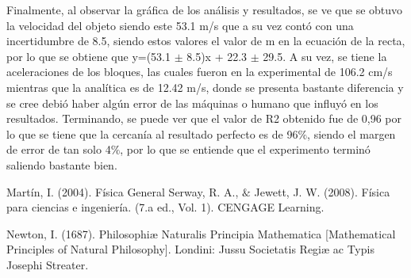 \documentclass{article}
\begin{document}
\begin{multicols}{2}
Finalmente, al observar la gráfica de los análisis y resultados, se ve que se obtuvo la velocidad del objeto siendo este 53.1 m/s que a su vez contó con una incertidumbre de 8.5, siendo estos valores el valor de m en la ecuación de la recta, por lo que se obtiene que y=(53.1 $\pm$ 8.5)x + 22.3 $\pm$ 29.5. A su vez, se tiene la aceleraciones de los bloques, las cuales fueron en la experimental de 106.2 cm/s mientras que la analítica es de 12.42 m/s, donde se presenta bastante diferencia y se cree debió haber algún error de las máquinas o humano que influyó en los resultados. Terminando, se puede ver que el valor de R2 obtenido fue de 0,96 por lo que se tiene que la cercanía al resultado perfecto es de 96$\%$, siendo el margen de error de tan solo 4$\%$, por lo que se entiende que el experimento terminó saliendo bastante bien.

\begin{thebibliography}{9}						%
		Martín, I. (2004). Física General
		Serway, R. A., $\&$ Jewett, J. W. (2008). Física para ciencias e ingeniería. (7.a
ed., Vol. 1). CENGAGE Learning.

	Newton, I. (1687). Philosophiæ Naturalis Principia Mathematica [Mathematical Principles of Natural Philosophy]. Londini: Jussu Societatis Regiæ ac Typis Josephi Streater.
\end{thebibliography}
\end{multicols}
\end{document}
